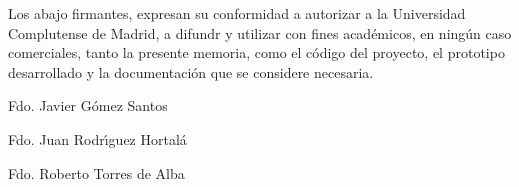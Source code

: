 Los abajo firmantes, expresan su conformidad a autorizar a la Universidad Complutense de Madrid, a difundr y utilizar con fines acad\'emicos, en ning\'un caso comerciales, tanto la presente memoria, como el c\'odigo del proyecto, el prototipo desarrollado y la documentaci\'on que se considere necesaria.
\vspace{4cm}

Fdo. Javier G\'omez Santos
\vspace{2cm}

Fdo. Juan Rodr\'\i guez Hortal\'a
\vspace{2cm}

Fdo. Roberto Torres de Alba

\vspace{2cm}